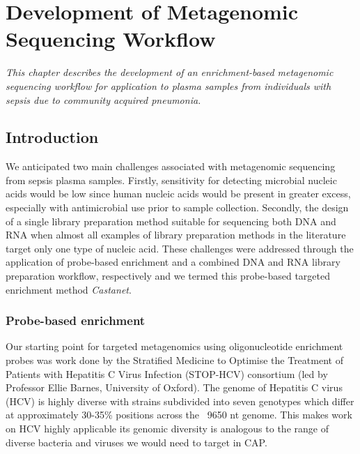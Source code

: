 \chapter{Development of Metagenomic Sequencing Workflow}
\label{ch:Results1}
\textit{This chapter describes the development of an enrichment-based metagenomic sequencing workflow for application to plasma samples from individuals with sepsis due to community acquired pneumonia.}

\startcontents[chapters]{\vspace{-1.4cm}}
\singlespacing
{}
\doublespacing

\section{Introduction}
We anticipated two main challenges associated with metagenomic sequencing from sepsis plasma samples. Firstly, sensitivity for detecting microbial nucleic acids would be low since human nucleic acids would be present in greater excess, especially with antimicrobial use prior to sample collection. Secondly, the design of a single library preparation method suitable for sequencing both DNA and RNA when almost all examples of library preparation methods in the literature target only one type of nucleic acid. These challenges were addressed through the application of probe-based enrichment and a combined DNA and RNA library preparation workflow, respectively and we termed this probe-based targeted enrichment method \textit{Castanet}.

\subsection{Probe-based enrichment} 
Our starting point for targeted metagenomics using oligonucleotide enrichment probes was work done \parencite{Bonsall2015} by the Stratified Medicine to Optimise the Treatment of Patients with Hepatitis C Virus Infection (STOP-HCV) consortium (led by Professor Ellie Barnes, University of Oxford). The genome of Hepatitis C virus (HCV) is highly diverse with strains subdivided into seven genotypes which differ at approximately 30-35\% positions across the ~9650 nt genome. This makes work on HCV highly applicable its genomic diversity is analogous to the range of diverse bacteria and viruses we would need to target in CAP.

